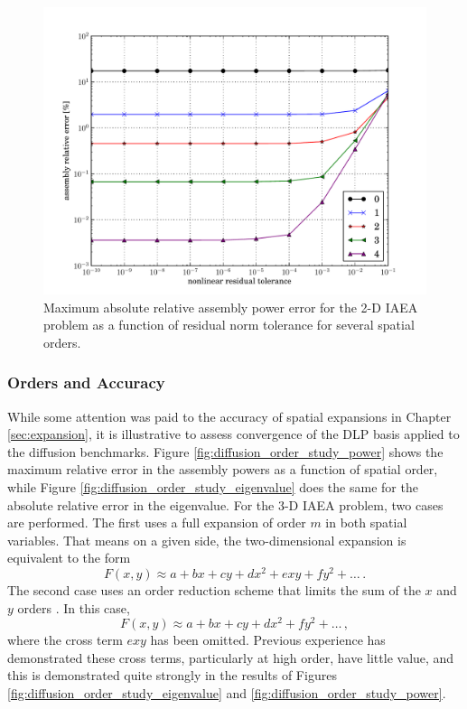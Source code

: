 \begin{figure}[ht]
    \centering
    \includegraphics[keepaspectratio, width = 5.0 in]
                    {tolerance_study_power}
    \caption{Maximum absolute relative assembly power error for the 2-D IAEA 
             problem as a function of 
             residual norm tolerance for several spatial orders.}
    \label{fig:tolerance_study_power}
\end{figure}

\subsubsection{Orders and Accuracy}
\label{sec:diffusion_order_accuracy}

While some attention was paid to the accuracy of spatial expansions in 
Chapter \ref{sec:expansion}, it is illustrative to assess convergence 
of the DLP basis applied to the diffusion benchmarks.  
Figure \ref{fig:diffusion_order_study_power}
 shows the maximum relative error in the assembly 
powers as a function of spatial order, while Figure 
\ref{fig:diffusion_order_study_eigenvalue} does 
the same for the absolute relative error in the eigenvalue.  For the 
3-D IAEA problem, two cases are performed.  The first uses a full 
expansion of order $m$ in both spatial variables.  That means on a given 
side, the two-dimensional expansion is equivalent to the form 
\begin{equation}
 F(x, y) \approx a + bx + cy + d x^2 + e xy + f y^2 + \ldots \, .
\end{equation}
The second case uses an order reduction scheme that 
limits the sum of the $x$ and $y$ orders \cite{forget2006tdh}.  In this case,
\begin{equation}
 F(x, y) \approx a + bx + cy + d x^2 + f y^2 + \ldots \, ,
\end{equation}
where the cross term $e xy$ has been omitted.  Previous experience 
has demonstrated these cross terms, particularly at high order, have 
little value, and this is demonstrated quite strongly in the results
of Figures \ref{fig:diffusion_order_study_eigenvalue} 
and \ref{fig:diffusion_order_study_power}.

